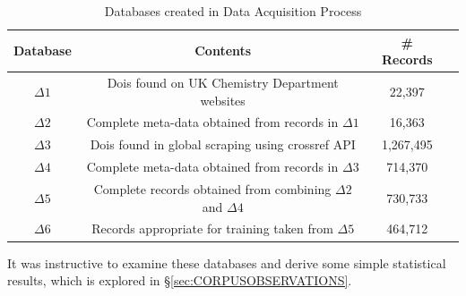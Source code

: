 \begin{table}[H]
\caption{Databases created in Data Acquisition Process}
\label{tab:DATABASES}
\begin{tabular}{||c|c|c|c||}
\hline 
Database &  Contents & \# Records\\
\hline
$\Delta1$ & Dois found on UK Chemistry Department websites & 22,397 \\
$\Delta2$ & Complete meta-data obtained from records in $\Delta1$ & 16,363 \\
$\Delta3$ & Dois found in global scraping using crossref API & 1,267,495  \\
$\Delta4$ & Complete meta-data obtained from records in $\Delta3$ & 714,370 \\
$\Delta5$ & Complete records obtained from combining $\Delta2$ and $\Delta4$ & 730,733 \\
$\Delta6$ & Records appropriate for training taken from $\Delta5$ & 464,712 \\
\hline
\end{tabular}
\end{table}

It was instructive to examine these databases and derive some simple statistical results, which is explored in \S\ref{sec:CORPUSOBSERVATIONS}.